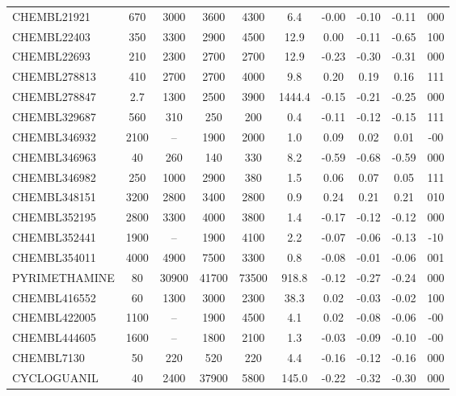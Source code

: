 \begin{landscape}
\begin{table}[htbp]
\begin{tabularx}{\linewidth}{@{}l c c c c c c c c c@{}}
CHEMBL21921 & 670 & 3000 & 3600 & 4300 & 6.4 & -0.00 & -0.10 & -0.11 & 000 \\
CHEMBL22403 & 350 & 3300 & 2900 & 4500 & 12.9 & 0.00 & -0.11 & -0.65 & 100 \\
CHEMBL22693 & 210 & 2300 & 2700 & 2700 & 12.9 & -0.23 & -0.30 & -0.31 & 000 \\
CHEMBL278813 & 410 & 2700 & 2700 & 4000 & 9.8 & 0.20 & 0.19 & 0.16 & 111 \\
CHEMBL278847 & 2.7 & 1300 & 2500 & 3900 & 1444.4 & -0.15 & -0.21 & -0.25 & 000 \\
CHEMBL329687 & 560 & 310 & 250 & 200 & 0.4 & -0.11 & -0.12 & -0.15 & 111 \\
CHEMBL346932 & 2100 & -- & 1900 & 2000 & 1.0 & 0.09 & 0.02 & 0.01 & -00 \\
CHEMBL346963 & 40 & 260 & 140 & 330 & 8.2 & -0.59 & -0.68 & -0.59 & 000 \\
CHEMBL346982 & 250 & 1000 & 2900 & 380 & 1.5 & 0.06 & 0.07 & 0.05 & 111 \\
CHEMBL348151 & 3200 & 2800 & 3400 & 2800 & 0.9 & 0.24 & 0.21 & 0.21 & 010 \\
CHEMBL352195 & 2800 & 3300 & 4000 & 3800 & 1.4 & -0.17 & -0.12 & -0.12 & 000 \\
CHEMBL352441 & 1900 & -- & 1900 & 4100 & 2.2 & -0.07 & -0.06 & -0.13 & -10 \\
CHEMBL354011 & 4000 & 4900 & 7500 & 3300 & 0.8 & -0.08 & -0.01 & -0.06 & 001 \\
PYRIMETHAMINE & 80 & 30900 & 41700 & 73500 & 918.8 & -0.12 & -0.27 & -0.24 & 000 \\
CHEMBL416552 & 60 & 1300 & 3000 & 2300 & 38.3 & 0.02 & -0.03 & -0.02 & 100 \\
CHEMBL422005 & 1100 & -- & 1900 & 4500 & 4.1 & 0.02 & -0.08 & -0.06 & -00 \\
CHEMBL444605 & 1600 & -- & 1800 & 2100 & 1.3 & -0.03 & -0.09 & -0.10 & -00 \\
CHEMBL7130 & 50 & 220 & 520 & 220 & 4.4 & -0.16 & -0.12 & -0.16 & 000 \\
CYCLOGUANIL & 40 & 2400 & 37900 & 5800 & 145.0 & -0.22 & -0.32 & -0.30 & 000 \\
\bottomrule
\end{tabularx}
\end{table}
\end{landscape}
